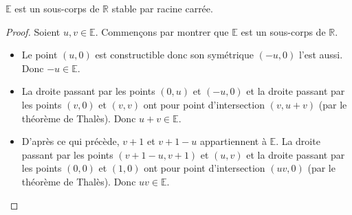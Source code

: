   \begin{lemma}
    \label{theoreme-de-wantzel-2}
    $\mathbb{E}$ est un sous-corps de $\mathbb{R}$ stable par racine carrée.
  \end{lemma}

  \begin{proof}
    Soient $u, v \in \mathbb{E}$. Commençons par montrer que $\mathbb{E}$ est un sous-corps de $\mathbb{R}$.
    \begin{itemize}
      \item Le point $(u, 0)$ est constructible donc son symétrique $(-u, 0)$ l'est aussi. Donc $-u \in \mathbb{E}$.
      \begin{center}
      \end{center}
      \item La droite passant par les points $(0, u)$ et $(-u, 0)$ et la droite passant par les points $(v, 0)$ et $(v, v)$ ont pour point d'intersection $(v, u + v)$ (par le théorème de Thalès). Donc $u + v \in \mathbb{E}$.
      \begin{center}
      \end{center}
      \item D'après ce qui précède, $v + 1$ et $v + 1 - u$ appartiennent à $\mathbb{E}$. La droite passant par les points $(v + 1 - u, v + 1)$ et $(u, v)$ et la droite passant par les points $(0,0)$ et $(1,0)$ ont pour point d'intersection $(uv, 0)$ (par le théorème de Thalès). Donc $uv \in \mathbb{E}$.

\end{itemize}
\end{proof}
